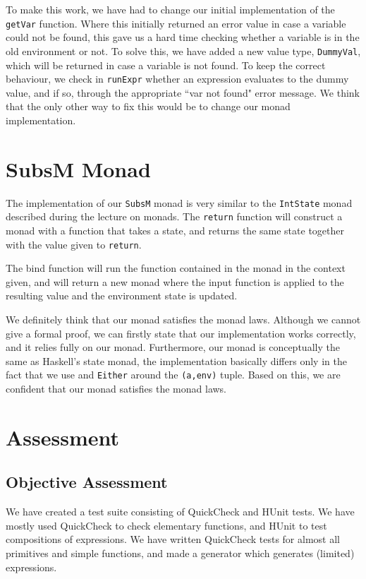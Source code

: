 \documentclass{article}
\begin{document}
To make this work, we have had to change our initial implementation of the \texttt{getVar} function. Where this initially returned an error value in case a variable could not be found, this gave us a hard time checking whether a variable is in the old environment or not. To solve this, we have added a new value type, \texttt{DummyVal}, which will be returned in case a variable is not found. To keep the correct behaviour, we check in \texttt{runExpr} whether an expression evaluates to the dummy value, and if so, through the appropriate ``var not found" error message. We think that the only other way to fix this would be to change our monad implementation.

\section{SubsM Monad}\label{monad}
The implementation of our \texttt{SubsM} monad is very similar to the \texttt{IntState} monad described during the lecture on monads. The \texttt{return} function will construct a monad with a function that takes a state, and returns the same state together with the value given to \texttt{return}. 

The bind function will run the function contained in the monad in the context given, and will return a new monad where the input function is applied to the resulting value and the environment state is updated.

We definitely think that our monad satisfies the monad laws. Although we cannot give a formal proof, we can firstly state that our implementation works correctly, and it relies fully on our monad. Furthermore, our monad is conceptually the same as Haskell's state monad, the implementation basically differs only in the fact that we use and \texttt{Either} around the \texttt{(a,env)} tuple. Based on this, we are confident that our monad satisfies the monad laws.

\section{Assessment}
\subsection{Objective Assessment}
We have created a test suite consisting of QuickCheck and HUnit tests. We have mostly used QuickCheck to check elementary functions, and HUnit to test compositions of expressions. We have written QuickCheck tests for almost all primitives and simple functions, and made a generator which generates (limited) expressions. 
\end{document}

